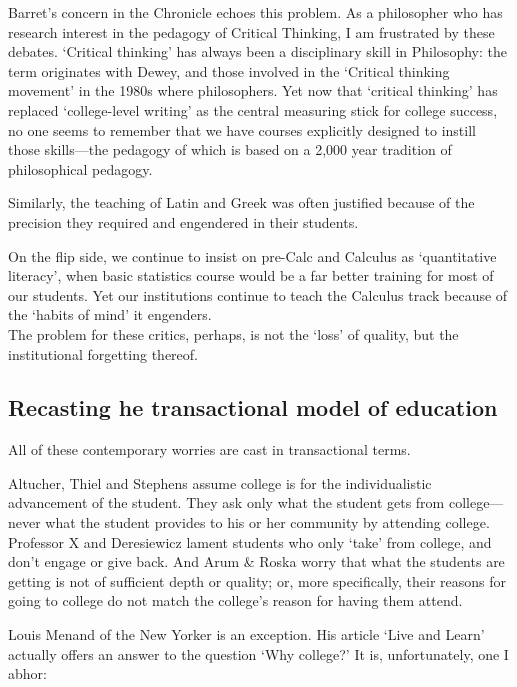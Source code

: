 Barret's concern in the Chronicle echoes this problem. As a philosopher who has research interest in the pedagogy of Critical Thinking, I am frustrated by these debates. `Critical thinking' has always been a disciplinary skill in Philosophy: the term originates with Dewey, and those involved in the `Critical thinking movement' in the 1980s where philosophers. Yet now that `critical thinking' has replaced `college-level writing' as the central measuring stick for college success, no one seems to remember that we have courses explicitly designed to instill those skills---the pedagogy of which is based on a 2,000 year tradition of philosophical pedagogy.

Similarly, the teaching of Latin and Greek was often justified because of the precision they required and engendered in their students. 

On the flip side, we continue to insist on pre-Calc and Calculus as `quantitative literacy', when basic statistics course would be a far better training for most of our students. Yet our institutions continue to teach the Calculus track because of the `habits of mind' it engenders.\\
The problem for these critics, perhaps, is not the `loss' of quality, but the institutional forgetting thereof.

\subsection{Recasting he transactional model of education}
\label{recastinghetransactionalmodelofeducation}

All of these contemporary worries are cast in transactional terms.

Altucher, Thiel and Stephens assume college is for the individualistic advancement of the student. They ask only what the student gets from college---never what the student provides to his or her community by attending college. Professor X and Deresiewicz lament students who only `take' from college, and don't engage or give back. And Arum \& Roska worry that what the students are getting is not of sufficient depth or quality; or, more specifically, their reasons for going to college do not match the college's reason for having them attend.

Louis Menand of the New Yorker is an exception. His article `Live and Learn' actually offers an answer to the question `Why college?' It is, unfortunately, one I abhor:

